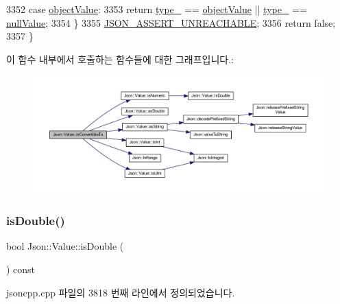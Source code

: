 \begin{DoxyCode}
3352   \textcolor{keywordflow}{case} \hyperlink{namespace_json_a7d654b75c16a57007925868e38212b4eae8386dcfc36d1ae897745f7b4f77a1f6}{objectValue}:
3353     \textcolor{keywordflow}{return} \hyperlink{class_json_1_1_value_abd222c2536dc88bf330dedcd076d2356}{type\_} == \hyperlink{namespace_json_a7d654b75c16a57007925868e38212b4eae8386dcfc36d1ae897745f7b4f77a1f6}{objectValue} || \hyperlink{class_json_1_1_value_abd222c2536dc88bf330dedcd076d2356}{type\_} == \hyperlink{namespace_json_a7d654b75c16a57007925868e38212b4ea7d9899633b4409bd3fc107e6737f8391}{nullValue};
3354   \}
3355   \hyperlink{jsoncpp_8cpp_aa5e619e3e9388f6376a344dd8462c9cc}{JSON\_ASSERT\_UNREACHABLE};
3356   \textcolor{keywordflow}{return} \textcolor{keyword}{false};
3357 \}
\end{DoxyCode}
이 함수 내부에서 호출하는 함수들에 대한 그래프입니다.\+:\nopagebreak
\begin{figure}[H]
\begin{center}
\leavevmode
\includegraphics[width=350pt]{class_json_1_1_value_af1ee6be27a96a7d12128efdd60deb54d_cgraph}
\end{center}
\end{figure}
\mbox{\label{class_json_1_1_value_a4a2e2a790e19a1c09fc5dd12d7ad47b5}} 
\subsubsection{\texorpdfstring{is\+Double()}{isDouble()}}
{\footnotesize\ttfamily bool Json\+::\+Value\+::is\+Double (\begin{DoxyParamCaption}{ }\end{DoxyParamCaption}) const}



jsoncpp.\+cpp 파일의 3818 번째 라인에서 정의되었습니다.


